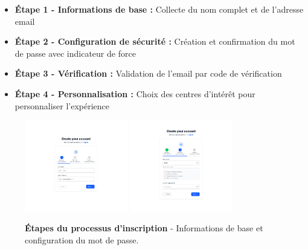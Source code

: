 \begin{itemize}
  \item \textbf{Étape 1 - Informations de base :} Collecte du nom complet et de l'adresse email
  \item \textbf{Étape 2 - Configuration de sécurité :} Création et confirmation du mot de passe avec indicateur de force
  \item \textbf{Étape 3 - Vérification :} Validation de l'email par code de vérification
  \item \textbf{Étape 4 - Personnalisation :} Choix des centres d'intérêt pour personnaliser l'expérience
\end{itemize}

\begin{figure}[h!]
  \centering
  \includegraphics[width=0.4\textwidth,keepaspectratio]{old-reports/week_4_img/etap1.jpeg}
  \includegraphics[width=0.4\textwidth,keepaspectratio]{old-reports/week_4_img/etap2.jpeg}
  \caption{\textbf{Étapes du processus d'inscription} - Informations de base et configuration du mot de passe.}
  \label{fig:signup_steps}
\end{figure}


